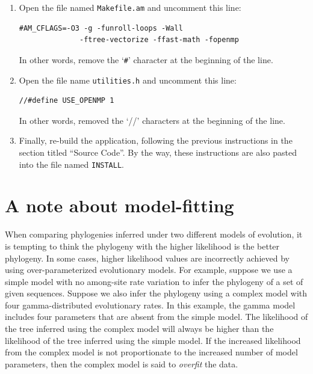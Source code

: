 \documentclass[11pt]{article}
\begin{document}
\begin{enumerate}
\item Open the file named \texttt{Makefile.am} and uncomment this line:

\begin{verbatim}
#AM_CFLAGS=-O3 -g -funroll-loops -Wall 
              -ftree-vectorize -ffast-math -fopenmp
\end{verbatim}

In other words, remove the `\texttt{\#}' character at the beginning of the line.

\item Open the file name \texttt{utilities.h} and uncomment this line:

\begin{verbatim}
//#define USE_OPENMP 1
\end{verbatim}

In other words, removed the `//' characters at the beginning of the line.

\item Finally, re-build the application, following the previous instructions in the section titled ``Source Code''.  By the way, these instructions are also pasted into the file named \texttt{INSTALL}.

\end{enumerate}



\pagebreak
\section{A note about model-fitting}

When comparing phylogenies inferred under two different models of evolution, it is tempting to think the phylogeny with the higher likelihood is the better phylogeny.  In some cases, higher likelihood values are incorrectly achieved by using over-parameterized evolutionary models.  For example, suppose we use a simple model with no among-site rate variation to infer the phylogeny of a set of given sequences.  Suppose we also infer the phylogeny using a complex model with four gamma-distributed evolutionary rates.  In this example, the gamma model includes four parameters that are absent from the simple model.  The likelihood of the tree inferred using the complex model will always be higher than the likelihood of the tree inferred using the simple model.  If the increased likelihood from the complex model is not proportionate to the increased number of model parameters, then the complex model is said to \textit{overfit} the data.
\end{document}
